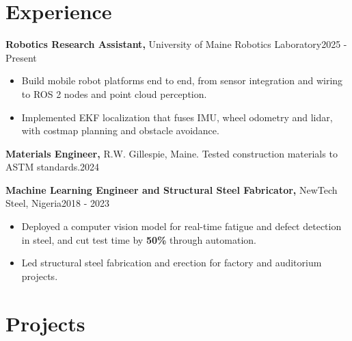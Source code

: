 \documentclass[10pt,letterpaper]{article}
\newcommand{\role}[3]{\vspace{2.8pt}\textbf{#1,} #2\hfill #3\par\vspace{1pt}}
\newcommand{\key}[1]{\textbf{#1}}          %
\begin{document}
\section{Experience}
\role{Robotics Research Assistant}{University of Maine Robotics Laboratory}{2025 - Present}
\begin{itemize}
  \item Build mobile robot platforms end to end, from sensor integration and wiring to ROS 2 nodes and point cloud perception.
  \item Implemented EKF localization that fuses IMU, wheel odometry and lidar, with costmap planning and obstacle avoidance.
\end{itemize}

\role{Materials Engineer}{R.W. Gillespie, Maine. Tested construction materials to ASTM standards.}{2024}

\role{Machine Learning Engineer and Structural Steel Fabricator}{NewTech Steel, Nigeria}{2018 - 2023}
\begin{itemize}
  \item Deployed a computer vision model for real-time fatigue and defect detection in steel, and cut test time by \key{50\%} through automation.
  \item Led structural steel fabrication and erection for factory and auditorium projects.
\end{itemize}

\section{Projects}
\end{document}
